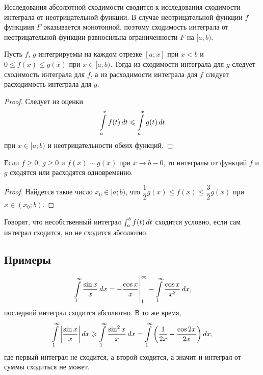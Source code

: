 \documentclass[a4paper]{article}
\theoremstyle{named}
\renewcommand{\int}{\intop}
\begin{document}
        \begin{remark*}
            Исследования абсолютной сходимости сводится к исследования сходимости интеграла от неотрицательной функции. В случае неотрицательной функции $f$ функциия $F$ оказывается монотонной, поэтому сходимость интеграла от неотрицательной функции равносильна ограниченности $F$ на $[a; b)$.
        \end{remark*}

        \begin{proposal*}
            Пусть $f$, $g$ интегрируемы на каждом отрезке $[a; x]$ при $x < b$ и $0 \leq f(x) \leq g(x)$ при $x \in [a; b)$. Тогда из сходимости интеграла для $g$ следует сходимость интеграла для $f$, а из расходимости интеграла для $f$ следует расходимость интеграла для $g$.
        \end{proposal*}

        \begin{proof}
            Следует из оценки
            \begin{equation*}
                \int_a^x f(t) \dd t \leq \int_a^x g(t) \dd t
            \end{equation*}
            при $x \in [a; b)$ и неотрицательности обеих функций.
        \end{proof}

        \begin{consequence*}
            Если $f \geq 0$, $g \geq 0$ и $f(x) \sim g(x)$ при $x \to b - 0$, то интегралы от функций $f$ и $g$ сходятся или расходятся одновременно.
        \end{consequence*}

        \begin{proof}
            Найдется такое число $x_0 \in [a; b)$, что $\dfrac{1}{2}g(x) \leq f(x) \leq \dfrac{3}{2}g(x)$ при $x \in (x_0; b)$.
        \end{proof}

        \begin{definition*}
            Говорят, что несобственный интеграл $\int_a^b f(t) \dd t$ сходится условно, если сам интеграл сходится, но не сходится абсолютно.
        \end{definition*}

        \subsection{Примеры}

        \begin{equation*}
            \left.\int_1^{\infty} \dfrac{\sin x}{x} \dd x = - \dfrac{\cos x}{x} \right|_1^{\infty} - \int_1^{\infty} \dfrac{\cos x}{x^2} \dd x,
        \end{equation*}
        последний интеграл сходится абсолютно. В то же время,
        \begin{equation*}
            \int_1^{\infty} \left|\dfrac{\sin x}{x}\right| \dd x \geq \int_1^{\infty} \dfrac{\sin^2 x}{x} \dd x = \int_1^{\infty} \left( \dfrac{1}{2x} - \dfrac{\cos 2x}{2x} \right)\dd x,
        \end{equation*}
        где первый интеграл не сходится, а второй сходится, а значит и интеграл от суммы сходиться не может.
\end{document}
